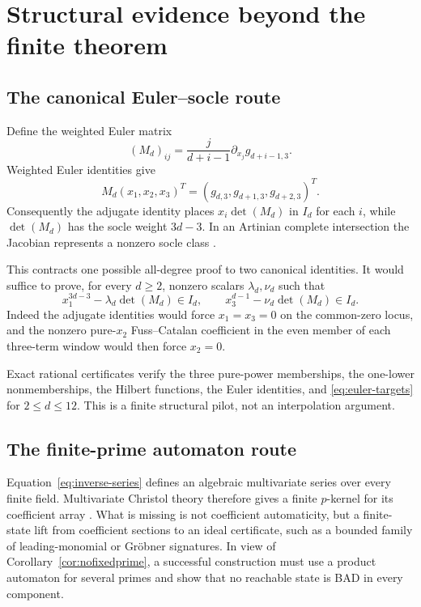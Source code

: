 \documentclass[11pt]{article}
\theoremstyle{definition}
\begin{document}
\section{Structural evidence beyond the finite theorem}

\subsection{The canonical Euler--socle route}

Define the weighted Euler matrix
\[
 (M_d)_{ij}=\frac{j}{d+i-1}\partial_{x_j}g_{d+i-1,3}.
\]
Weighted Euler identities give
\[
 M_d(x_1,x_2,x_3)^T=(g_{d,3},g_{d+1,3},g_{d+2,3})^T.
\]
Consequently the adjugate identity places $x_i\det(M_d)$ in $I_d$ for each
$i$, while $\det(M_d)$ has the socle weight $3d-3$.  In an Artinian complete
intersection the Jacobian represents a nonzero socle class
\cite{SchejaStorch1975}.

This contracts one possible all-degree proof to two canonical identities.  It
would suffice to prove, for every $d\ge2$, nonzero scalars $\lambda_d,\nu_d$
such that
\begin{equation}\label{eq:euler-targets}
 x_1^{3d-3}-\lambda_d\det(M_d)\in I_d,
 \qquad
 x_3^{d-1}-\nu_d\det(M_d)\in I_d.
\end{equation}
Indeed the adjugate identities would force $x_1=x_3=0$ on the common-zero
locus, and the nonzero pure-$x_2$ Fuss--Catalan coefficient in the even member
of each three-term window would then force $x_2=0$.

Exact rational certificates verify the three pure-power memberships, the
one-lower nonmemberships, the Hilbert functions, the Euler identities, and
\eqref{eq:euler-targets} for $2\le d\le12$.  This is a finite structural
pilot, not an interpolation argument.

\subsection{The finite-prime automaton route}

Equation~\eqref{eq:inverse-series} defines an algebraic multivariate series
over every finite field.  Multivariate Christol theory therefore gives a
finite $p$-kernel for its coefficient array \cite{AdamczewskiBostanCaruso,
RowlandYassawi}.  What is missing is not coefficient automaticity, but a
finite-state lift from coefficient sections to an ideal certificate, such as
a bounded family of leading-monomial or Gr\"obner signatures.  In view of
Corollary~\ref{cor:nofixedprime}, a successful construction must use a product
automaton for several primes and show that no reachable state is BAD in every
component.
\end{document}
